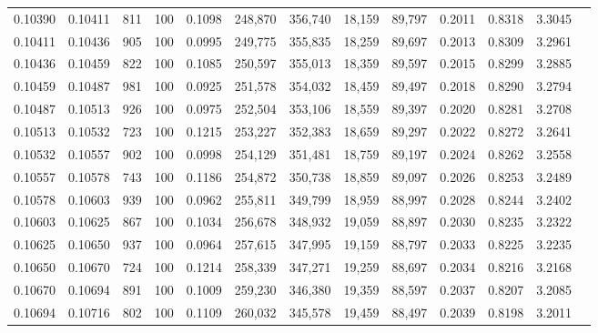\begin{tabular}{rrrrrrrrrrrrr}
0.10390 & 0.10411 &   811 & 100 &                                     0.1098 & 248,870 & 356,740 &  18,159 &  89,797 & 0.2011 & 0.8318 & 3.3045 \\
0.10411 & 0.10436 &   905 & 100 &                                     0.0995 & 249,775 & 355,835 &  18,259 &  89,697 & 0.2013 & 0.8309 & 3.2961 \\
0.10436 & 0.10459 &   822 & 100 &                                     0.1085 & 250,597 & 355,013 &  18,359 &  89,597 & 0.2015 & 0.8299 & 3.2885 \\
0.10459 & 0.10487 &   981 & 100 &                                     0.0925 & 251,578 & 354,032 &  18,459 &  89,497 & 0.2018 & 0.8290 & 3.2794 \\
0.10487 & 0.10513 &   926 & 100 &                                     0.0975 & 252,504 & 353,106 &  18,559 &  89,397 & 0.2020 & 0.8281 & 3.2708 \\
0.10513 & 0.10532 &   723 & 100 &                                     0.1215 & 253,227 & 352,383 &  18,659 &  89,297 & 0.2022 & 0.8272 & 3.2641 \\
0.10532 & 0.10557 &   902 & 100 &                                     0.0998 & 254,129 & 351,481 &  18,759 &  89,197 & 0.2024 & 0.8262 & 3.2558 \\
0.10557 & 0.10578 &   743 & 100 &                                     0.1186 & 254,872 & 350,738 &  18,859 &  89,097 & 0.2026 & 0.8253 & 3.2489 \\
0.10578 & 0.10603 &   939 & 100 &                                     0.0962 & 255,811 & 349,799 &  18,959 &  88,997 & 0.2028 & 0.8244 & 3.2402 \\
0.10603 & 0.10625 &   867 & 100 &                                     0.1034 & 256,678 & 348,932 &  19,059 &  88,897 & 0.2030 & 0.8235 & 3.2322 \\
0.10625 & 0.10650 &   937 & 100 &                                     0.0964 & 257,615 & 347,995 &  19,159 &  88,797 & 0.2033 & 0.8225 & 3.2235 \\
0.10650 & 0.10670 &   724 & 100 &                                     0.1214 & 258,339 & 347,271 &  19,259 &  88,697 & 0.2034 & 0.8216 & 3.2168 \\
0.10670 & 0.10694 &   891 & 100 &                                     0.1009 & 259,230 & 346,380 &  19,359 &  88,597 & 0.2037 & 0.8207 & 3.2085 \\
0.10694 & 0.10716 &   802 & 100 &                                     0.1109 & 260,032 & 345,578 &  19,459 &  88,497 & 0.2039 & 0.8198 & 3.2011 \\

\end{tabular}
